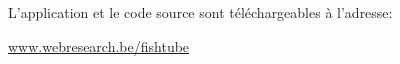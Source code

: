 L'application et le code source sont téléchargeables à l'adresse:
	\begin{center}
		\url{www.webresearch.be/fishtube}
	\end{center}  